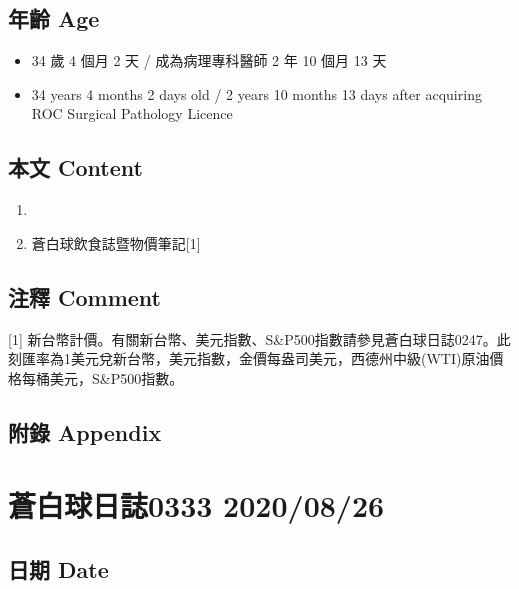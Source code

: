 \documentclass[a5paper, 11pt
]{book}
\providecommand{\tightlist}{%
  \setlength{\itemsep}{0pt}\setlength{\parskip}{0pt}}
\begin{document}
\hypertarget{ux5e74ux9f61-age-85}{%
\subsection{年齡 Age}\label{ux5e74ux9f61-age-85}}

\begin{itemize}
\tightlist
\item
  34 歲 4 個月 2 天 / 成為病理專科醫師 2 年 10 個月 13 天
\item
  34 years 4 months 2 days old / 2 years 10 months 13 days after
  acquiring ROC Surgical Pathology Licence
\end{itemize}

\hypertarget{ux672cux6587-content-85}{%
\subsection{本文 Content}\label{ux672cux6587-content-85}}

\begin{enumerate}
\def\labelenumi{\arabic{enumi}.}
\tightlist
\item
\item
  蒼白球飲食誌暨物價筆記{[}1{]}
\end{enumerate}

\hypertarget{ux6ce8ux91cb-comment-85}{%
\subsection{注釋 Comment}\label{ux6ce8ux91cb-comment-85}}

{[}1{]}
新台幣計價。有關新台幣、美元指數、S\&P500指數請參見蒼白球日誌0247。此刻匯率為1美元兌新台幣，美元指數，金價每盎司美元，西德州中級(WTI)原油價格每桶美元，S\&P500指數。

\hypertarget{ux9644ux9304-appendix-85}{%
\subsection{附錄 Appendix}\label{ux9644ux9304-appendix-85}}

\hypertarget{ux84bcux767dux7403ux65e5ux8a8c0333-20200826}{%
\section{蒼白球日誌0333
2020/08/26}\label{ux84bcux767dux7403ux65e5ux8a8c0333-20200826}}

\hypertarget{ux65e5ux671f-date-86}{%
\subsection{日期 Date}\label{ux65e5ux671f-date-86}}
\end{document}
